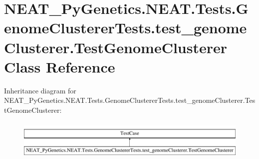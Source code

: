 \hypertarget{classNEAT__PyGenetics_1_1NEAT_1_1Tests_1_1GenomeClustererTests_1_1test__genomeClusterer_1_1TestGenomeClusterer}{}\section{N\+E\+A\+T\+\_\+\+Py\+Genetics.\+N\+E\+A\+T.\+Tests.\+Genome\+Clusterer\+Tests.\+test\+\_\+genome\+Clusterer.\+Test\+Genome\+Clusterer Class Reference}
\label{classNEAT__PyGenetics_1_1NEAT_1_1Tests_1_1GenomeClustererTests_1_1test__genomeClusterer_1_1TestGenomeClusterer}
Inheritance diagram for N\+E\+A\+T\+\_\+\+Py\+Genetics.\+N\+E\+A\+T.\+Tests.\+Genome\+Clusterer\+Tests.\+test\+\_\+genome\+Clusterer.\+Test\+Genome\+Clusterer\+:\begin{figure}[H]
\begin{center}
\leavevmode
\includegraphics[height=1.944445cm]{classNEAT__PyGenetics_1_1NEAT_1_1Tests_1_1GenomeClustererTests_1_1test__genomeClusterer_1_1TestGenomeClusterer}
\end{center}
\end{figure}
